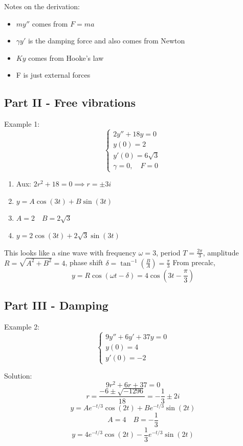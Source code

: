 \documentclass[12pt]{article}
\begin{document}
Notes on the derivation:
\begin{itemize}
    \item $my''$ comes from $F = ma$
    \item $\gamma y'$ is the damping force and also comes from Newton
    \item $Ky$ comes from Hooke's law 
    \item F is just external forces
\end{itemize}

\subsection*{Part II - Free vibrations}
Example 1:
\[\begin{cases}
    2y'' + 18y = 0\\
    y(0) = 2\\
    y'(0) = 6\sqrt{3}\\
    \gamma = 0, \quad F = 0
\end{cases}\]

\begin{enumerate}
    \item Aux: $2r^2 + 18 = 0 \implies r = \pm 3i$
    \item $y = A\cos(3t) + B\sin(3t)$
    \item $A = 2 \quad B = 2\sqrt{3}$
    \item $\boxed{y = 2\cos(3t) + 2\sqrt{3} \sin (3t)}$
\end{enumerate}
This looks like a sine wave with frequency $\omega = 3$, period $T = \frac{2\pi}{3}$, amplitude $R = \sqrt{A^2 + B^2} = 4$, phase shift $\delta = \tan^{-1} \left(\frac{B}{A}\right) = \frac{\pi}{3}$
From precalc,
\[y = R\cos(\omega t - \delta) = 4\cos(3t - \frac{\pi}{3})\]

\subsection*{Part III - Damping}
Example 2:
\[\begin{cases}
    9y'' + 6y' + 37y = 0\\
    y(0) = 4\\
    y'(0) = -2
\end{cases}\]

Solution:
\[9r^2 + 6r + 37 = 0\]
\[r = \frac{-6 \pm \sqrt{-1296}}{18} = -\frac{1}{3} \pm 2i\]
\[y = Ae^{-t/3}\cos(2t)+ Be^{-t/3} \sin(2t)\]
\[A = 4 \quad B = -\frac{1}{3}\]
\[y = 4e^{-t/3}\cos(2t)- \frac{1}{3} e^{-t/3} \sin(2t)\]
\end{document}
